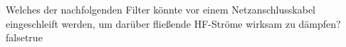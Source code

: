     {Welches der nachfolgenden Filter könnte vor einem Netzanschlusskabel eingeschleift werden, um darüber fließende HF-Ströme wirksam zu dämpfen?}
    {}
    {}
    {}
    {}
    {false}{true}